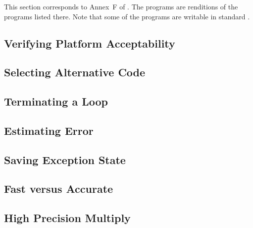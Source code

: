 \documentclass[../../CDR-IEEE-754-support.tex]{subfiles}
\begin{document}
This section corresponds to Annex~F of \cite{2012:LIA1}.  The programs
are \CL{} renditions of the programs listed there.  Note that some of
the programs are writable in standard \CL{}.

\subsection{Verifying Platform Acceptability}


\subsection{Selecting Alternative Code}


\subsection{Terminating a Loop}


\subsection{Estimating Error}


\subsection{Saving Exception State}


\subsection{Fast versus Accurate}


\subsection{High Precision Multiply}

\end{document}
